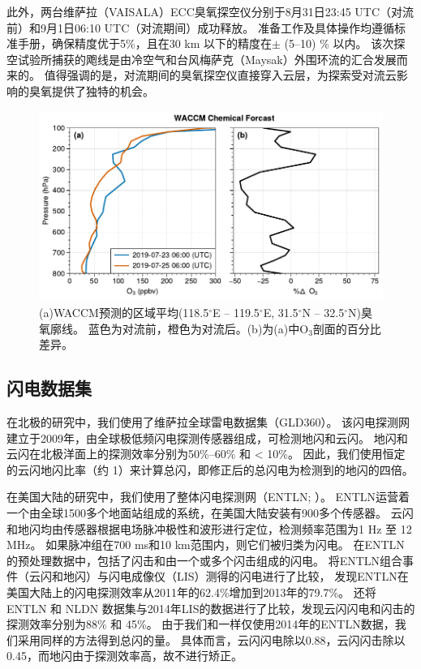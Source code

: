 此外，两台维萨拉（VAISALA）ECC臭氧探空仪分别于8月31日23:45 UTC（对流前）和9月1日06:10 UTC（对流期间）成功释放。
准备工作及具体操作均遵循标准手册，确保精度优于5\%，且在30 km 以下的精度在$\pm$ (5--10) \% 以内\citep{Smit.2007}。
该次探空试验所捕获的飑线是由冷空气和台风梅萨克（Maysak）外围环流的汇合发展而来的。
值得强调的是，对流期间的臭氧探空仪直接穿入云层，为探索受对流云影响的臭氧提供了独特的机会。



\begin{figure}[htbp]
\centering
\includegraphics[width=35em]{./figures/waccm_forcast_o3.pdf}
\caption{(a)WACCM预测的区域平均(118.5$^{\circ}$E -- 119.5$^{\circ}$E, 31.5$^{\circ}$N – 32.5$^{\circ}$N)臭氧廓线。
蓝色为对流前，橙色为对流后。(b)为(a)中O$_3$剖面的百分比差异。}
\label{figure:waccm_forcast_o3}
\end{figure}

\subsection{闪电数据集}

在北极的研究中，我们使用了维萨拉全球雷电数据集（GLD360）。
该闪电探测网建立于2009年，由全球极低频闪电探测传感器组成，可检测地闪和云闪\citep{Said.2010,Said.2013,Said.2017}。
地闪和云闪在北极洋面上的探测效率分别为50\%--60\% 和 < 10\%\citep{Vagasky.2022}。
因此，我们使用恒定的云闪地闪比率（约 1）来计算总闪，即修正后的总闪电为检测到的地闪的四倍\citep{Mackerras.1994,Prentice.1977}。

在美国大陆的研究中，我们使用了整体闪电探测网（ENTLN; \citet{Marchand.2019}）。
ENTLN运营着一个由全球1500多个地面站组成的系统，在美国大陆安装有900多个传感器\citep{Zhu.2017}。
云闪和地闪均由传感器根据电场脉冲极性和波形进行定位，检测频率范围为1 Hz 至 12 MHz。
如果脉冲组在700 ms和10 km范围内，则它们被归类为闪电。
在ENTLN的预处理数据中，包括了闪击和由一个或多个闪击组成的闪电。
\citet{Rudlosky.2015}将ENTLN组合事件（云闪和地闪）与闪电成像仪（LIS）测得的闪电进行了比较，
发现ENTLN在美国大陆上的闪电探测效率从2011年的62.4\%增加到2013年的79.7\%。
\citet{Lapierre.2020}还将 ENTLN 和 NLDN 数据集与2014年LIS的数据进行了比较，发现云闪闪电和闪击的探测效率分别为88\% 和 45\%。
由于我们和\citet{Lapierre.2020}一样仅使用2014年的ENTLN数据，我们采用同样的方法得到总闪的量。
具体而言，云闪闪电除以0.88，云闪闪击除以0.45，而地闪由于探测效率高，故不进行矫正。

